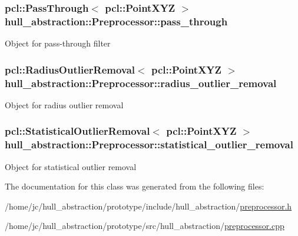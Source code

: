 \subsubsection[{\texorpdfstring{pass\+\_\+through}{pass_through}}]{\setlength{\rightskip}{0pt plus 5cm}pcl\+::\+Pass\+Through$<$ pcl\+::\+Point\+X\+YZ $>$ hull\+\_\+abstraction\+::\+Preprocessor\+::pass\+\_\+through\hspace{0.3cm}{\ttfamily [private]}}\hypertarget{classhull__abstraction_1_1_preprocessor_a9396fe58d584ed1e7468f694f2458734}{}\label{classhull__abstraction_1_1_preprocessor_a9396fe58d584ed1e7468f694f2458734}
Object for pass-\/through filter 
\subsubsection[{\texorpdfstring{radius\+\_\+outlier\+\_\+removal}{radius_outlier_removal}}]{\setlength{\rightskip}{0pt plus 5cm}pcl\+::\+Radius\+Outlier\+Removal$<$ pcl\+::\+Point\+X\+YZ $>$ hull\+\_\+abstraction\+::\+Preprocessor\+::radius\+\_\+outlier\+\_\+removal\hspace{0.3cm}{\ttfamily [private]}}\hypertarget{classhull__abstraction_1_1_preprocessor_af0a5e8dd7c130abe702230dd59529360}{}\label{classhull__abstraction_1_1_preprocessor_af0a5e8dd7c130abe702230dd59529360}
Object for radius outlier removal 
\subsubsection[{\texorpdfstring{statistical\+\_\+outlier\+\_\+removal}{statistical_outlier_removal}}]{\setlength{\rightskip}{0pt plus 5cm}pcl\+::\+Statistical\+Outlier\+Removal$<$ pcl\+::\+Point\+X\+YZ $>$ hull\+\_\+abstraction\+::\+Preprocessor\+::statistical\+\_\+outlier\+\_\+removal\hspace{0.3cm}{\ttfamily [private]}}\hypertarget{classhull__abstraction_1_1_preprocessor_af9b4760942460988811e9989da18633f}{}\label{classhull__abstraction_1_1_preprocessor_af9b4760942460988811e9989da18633f}
Object for statistical outlier removal 

The documentation for this class was generated from the following files\+:\begin{DoxyCompactItemize}
\item 
/home/jc/hull\+\_\+abstraction/prototype/include/hull\+\_\+abstraction/\hyperlink{prototype_2include_2hull__abstraction_2preprocessor_8h}{preprocessor.\+h}\item 
/home/jc/hull\+\_\+abstraction/prototype/src/hull\+\_\+abstraction/\hyperlink{prototype_2src_2hull__abstraction_2preprocessor_8cpp}{preprocessor.\+cpp}\end{DoxyCompactItemize}
